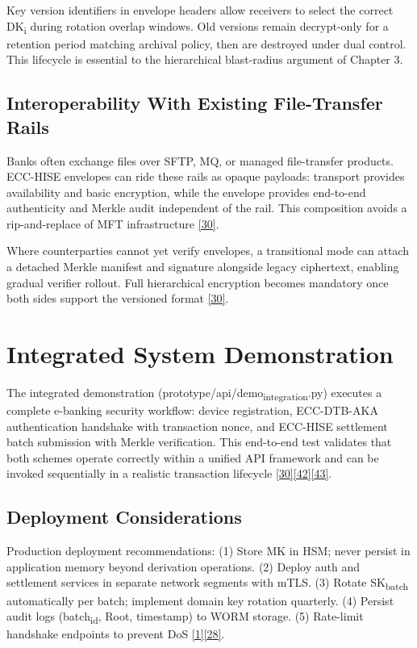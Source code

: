 \indent Key version identifiers in envelope headers allow receivers to select the correct DK\textsubscript{i} during rotation overlap windows. Old versions remain decrypt-only for a retention period matching archival policy, then are destroyed under dual control. This lifecycle is essential to the hierarchical blast-radius argument of Chapter 3.

\subsection{Interoperability With Existing File-Transfer Rails}

\indent Banks often exchange files over SFTP, MQ, or managed file-transfer products. ECC-HISE envelopes can ride these rails as opaque payloads: transport provides availability and basic encryption, while the envelope provides end-to-end authenticity and Merkle audit independent of the rail. This composition avoids a rip-and-replace of MFT infrastructure \hyperref[ref:30]{[30]}.

\indent Where counterparties cannot yet verify envelopes, a transitional mode can attach a detached Merkle manifest and signature alongside legacy ciphertext, enabling gradual verifier rollout. Full hierarchical encryption becomes mandatory once both sides support the versioned format \hyperref[ref:30]{[30]}.

\section{Integrated System Demonstration}

\indent The integrated demonstration (prototype/api/demo\textsubscript{integration}.py) executes a complete e-banking security workflow: device registration, ECC-DTB-AKA authentication handshake with transaction nonce, and ECC-HISE settlement batch submission with Merkle verification. This end-to-end test validates that both schemes operate correctly within a unified API framework and can be invoked sequentially in a realistic transaction lifecycle \hyperref[ref:30]{[30]}\hyperref[ref:42]{[42]}\hyperref[ref:43]{[43]}.

\subsection{Deployment Considerations}

\indent Production deployment recommendations: (1) Store MK in HSM; never persist in application memory beyond derivation operations. (2) Deploy auth and settlement services in separate network segments with mTLS. (3) Rotate SK\textsubscript{batch} automatically per batch; implement domain key rotation quarterly. (4) Persist audit logs (batch\textsubscript{id}, Root, timestamp) to WORM storage. (5) Rate-limit handshake endpoints to prevent DoS \hyperref[ref:1]{[1]}\hyperref[ref:28]{[28]}.

